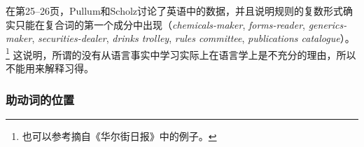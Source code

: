 在第25--26页，Pullum和Scholz讨论了英语中的数据，并且说明规则的复数形式确实只能在复合词的第一个成分中出现（\emph{chemicals-maker}, \emph{forms-reader}, \emph{generics-maker},
\emph{securities-dealer}, \emph{drinks trolley}, \emph{rules committee}, \emph{publications
  catalogue}）。\footnote{
也可以参考摘自《华尔街日报》中的例子。
}
这说明，所谓的没有从语言事实中学习实际上在语言学上是不充分的理由，所以不能用来解释习得。

\subsubsection{助动词的位置}

